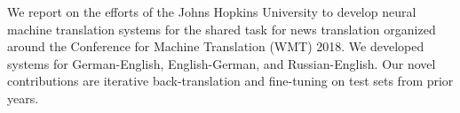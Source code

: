 We report on the efforts of the Johns Hopkins University to develop neural machine translation systems for the shared task for news translation organized around the Conference for Machine Translation (WMT) 2018. We developed systems for German-English, English-German, and Russian-English. Our novel contributions are iterative back-translation and fine-tuning on test sets from prior years.
